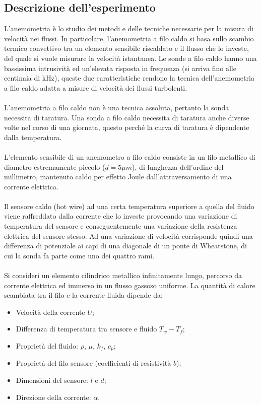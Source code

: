 \subsection{Descrizione dell'esperimento}
L'anemometria è lo studio dei metodi e delle tecniche necessarie per la misura di velocità nei flussi. In particolare, l'anemometria a filo caldo si basa sullo scambio termico convettivo tra un elemento sensibile riscaldato e il flusso che lo investe, del quale si vuole misurare la velocità istantanea. Le sonde a filo caldo hanno una bassissima intrusività ed un'elevata risposta in frequenza (si arriva fino alle centinaia di kHz), queste due caratteristiche rendono la tecnica dell'anemometria a filo caldo adatta a misure di velocità dei flussi turbolenti.\\\\
L'anemometria a filo caldo non è una tecnica assoluta, pertanto la sonda necessita di taratura. Una sonda a filo caldo necessita di taratura anche diverse volte nel corso di una giornata, questo perché la curva di taratura è dipendente dalla temperatura.\\\\
L'elemento sensibile di un anemometro a filo caldo consiste in un filo metallico di diametro estremamente piccolo ($d=5\mu m$), di lunghezza dell'ordine del millimetro, mantenuto caldo per effetto Joule dall'attraversamento di una corrente elettrica.\\\\
Il sensore caldo (hot wire) ad una certa temperatura superiore a quella del fluido viene raffreddato dalla corrente che lo investe provocando una variazione di temperatura del sensore e conseguentemente una variazione della resistenza elettrica del sensore stesso. Ad una variazione di velocità corrisponde quindi una differenza di potenziale ai capi di una diagonale di un ponte di Wheatstone, di cui la sonda fa parte come uno dei quattro rami.\\\\
Si consideri un elemento cilindrico metallico infinitamente lungo, percorso da corrente elettrica ed immerso in un flusso gassoso uniforme. La quantità di calore scambiata tra il filo e la corrente fluida dipende da:
\begin{itemize}
    \item Velocità della corrente $U$;
    \item Differenza di temperatura tra sensore e fluido $T_w-T_f$;
    \item Proprietà del fluido: $\rho$, $\mu$, $k_f$, $c_p$;
    \item Proprietà del filo sensore (coefficienti di resistività $b$);
    \item Dimensioni del sensore: $l$ e $d$;
    \item Direzione della corrente: $\alpha$.
\end{itemize}
